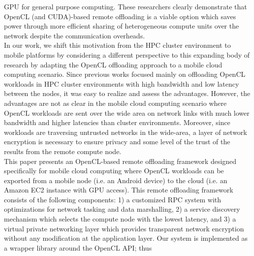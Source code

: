 \documentclass[10pt, conference, compsocconf]{IEEEtran}
\begin{document}
GPU for general purpose computing.
%
These researchers clearly demonstrate that OpenCL (and CUDA)-based
remote offloading is a viable option which saves power through more efficient
sharing of heterogeneous compute units over the network despite the
communication overheads.\\
%
\indent In our work, we shift this motivation from the HPC cluster environment
to mobile platforms by considering a different perspective to this
expanding body of research by adapting the OpenCL offloading approach to
a mobile cloud computing scenario.
%
%
%
%
%
Since previous works focused mainly on offloading OpenCL workloads in
HPC cluster environments with high bandwidth and low latency between the
nodes, it was easy to realize and assess the advantages.
%
However, the advantages are not as clear in the mobile cloud computing
scenario where OpenCL workloads are sent over the wide area on
network links with much lower bandwidth and higher latencies than 
cluster environments.
%
Moreover, since workloads are traversing untrusted networks in the
wide-area, a layer of network encryption is necessary to ensure privacy
and some level of the trust of the results from the remote compute node.\\
%
\indent This paper presents an OpenCL-based remote offloading framework designed
specifically for mobile cloud computing where OpenCL workloads can be exported
from a mobile node (i.e. an Android device) to the cloud (i.e.
an Amazon EC2 instance with GPU access).
%
This remote offloading framework consists of the following components:
1) a customized RPC system with optimizations for network tasking and
data marshalling, 2) a service discovery mechanism which selects the 
compute node with the lowest latency, and 3) a virtual private networking 
layer which provides transparent network encryption without any modification 
at the application layer.
%
Our system is implemented as a wrapper library around the OpenCL API; thus
\end{document}
